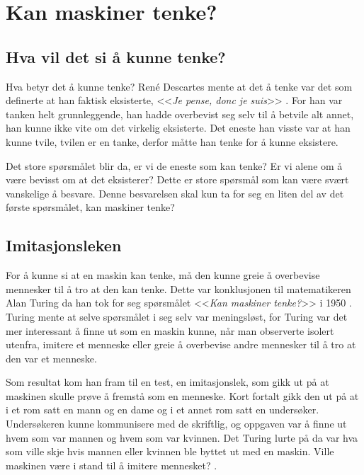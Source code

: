 \section{Kan maskiner tenke?}

\subsection{Hva vil det si å kunne tenke?}

Hva betyr det å kunne tenke?
René Descartes mente at det å tenke var det som definerte at han faktisk eksisterte, <<\textit{Je pense, donc je suis}>> \autocite[30]{Descartes1637}.
For han var tanken helt grunnleggende, 
han hadde overbevist seg selv til å betvile alt annet, han kunne ikke vite om det virkelig eksisterte. 
Det eneste han visste var at han kunne tvile, tvilen er en tanke, derfor måtte han tenke for å kunne eksistere.

Det store spørsmålet blir da, er vi de eneste som kan tenke? 
Er vi alene om å være bevisst om at det eksisterer? 
Dette er store spørsmål som kan være svært vanskelige å besvare. 
Denne besvarelsen skal kun ta for seg en liten del av det første spørsmålet, 
kan maskiner tenke?

\subsection{Imitasjonsleken}

For å kunne si at en maskin kan tenke, må den kunne greie å overbevise mennesker til å tro at den kan tenke. Dette var konklusjonen til matematikeren Alan Turing da han tok for seg spørsmålet <<\textit{Kan maskiner tenke?}>> i 1950 \autocite{Kiran2013}. 
Turing mente at selve spørsmålet i seg selv var meningsløst, for Turing var det mer interessant å finne ut som en maskin kunne, når man observerte isolert utenfra, imitere et menneske eller greie å overbevise andre mennesker til å tro at den var et menneske.

Som resultat kom han fram til en test, en imitasjonslek, som gikk ut på at maskinen skulle prøve å fremstå som en menneske.
Kort fortalt gikk den ut på at i et rom satt en mann og en dame og i et annet rom satt en undersøker. 
Undersøkeren kunne kommunisere med de skriftlig, og oppgaven var å finne ut hvem som var mannen og hvem som var kvinnen.
Det Turing lurte på da var hva som ville skje hvis mannen eller kvinnen ble byttet ut med en maskin. 
Ville maskinen være i stand til å imitere mennesket?
\autocite[433-434]{Turing1950}.

